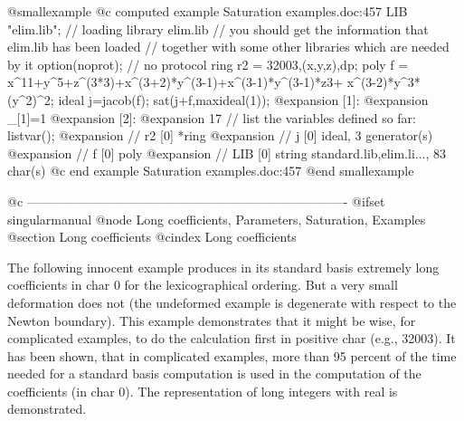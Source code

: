 @smallexample
@c computed example Saturation examples.doc:457 
  LIB "elim.lib";         // loading library elim.lib
  // you should get the information that elim.lib has been loaded
  // together with some other libraries which are needed by it
  option(noprot);         // no protocol
  ring r2 = 32003,(x,y,z),dp;
  poly f = x^11+y^5+z^(3*3)+x^(3+2)*y^(3-1)+x^(3-1)*y^(3-1)*z3+
    x^(3-2)*y^3*(y^2)^2;
  ideal j=jacob(f);
  sat(j+f,maxideal(1));
@expansion{} [1]:
@expansion{}    _[1]=1
@expansion{} [2]:
@expansion{}    17
  // list the variables defined so far:
  listvar();
@expansion{} // r2                   [0]  *ring
@expansion{} //      j                    [0]  ideal, 3 generator(s)
@expansion{} //      f                    [0]  poly
@expansion{} // LIB                  [0]  string standard.lib,elim.li..., 83 char(s)
@c end example Saturation examples.doc:457
@end smallexample

@c ----------------------------------------------------------------------------
@ifset singularmanual
@node Long coefficients, Parameters, Saturation, Examples
@section Long coefficients
@cindex Long coefficients

The following innocent example produces in its standard basis
extremely long coefficients in char 0 for the lexicographical
ordering.
But a very small deformation does not (the undeformed
example is degenerate with respect to the Newton boundary).
This example demonstrates that it might be wise, for complicated
examples, to do the calculation first in positive char (e.g., 32003).
It has been shown, that in complicated examples, more than 95 percent of
the time needed for a standard basis computation is used in the
computation of the coefficients (in char 0).
The representation of long integers with real is demonstrated.

